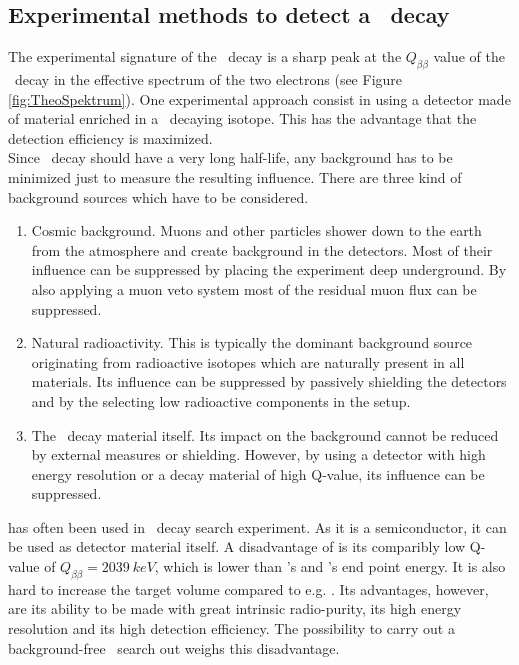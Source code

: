 \documentclass[encoding=utf8,british]{tumphthesis}
\begin{document}
\subsection{Experimental methods to detect a \onbb\ decay}

The experimental signature of the \onbb\ decay is a sharp peak at the $Q_{\beta\beta}$ value of the \twonu\ decay in the effective spectrum of the two electrons (see Figure \ref{fig:TheoSpektrum}).
One experimental approach consist in using a detector made of material enriched in a \onbb\ decaying isotope.
This has the advantage that the detection efficiency is maximized.
\\

Since \onbb\ decay should have a very long half-life, any background has to be minimized just to measure the resulting influence.
There are three kind of background sources which have to be considered.
\begin{enumerate}
    \item Cosmic background.
Muons and other particles shower down to the earth from the atmosphere and create background in the detectors.
Most of their influence can be suppressed by placing the experiment deep underground.
By also applying a muon veto system most of the residual muon flux can be suppressed.
\item Natural radioactivity.
This is typically the dominant background source originating from radioactive isotopes which are naturally present in all materials.
Its influence can be suppressed by passively shielding the detectors and by the selecting low radioactive components in the setup. 
\item The \twonu\ decay material itself.
Its impact on the background cannot be reduced by external measures or shielding.
However, by using a detector with high energy resolution or a decay material of high Q-value, its influence can be suppressed.
\end{enumerate}
 has often been used in \onbb\ decay search experiment. 
As it is a semiconductor, it can be used as detector material itself.
A disadvantage of  is its comparibly low Q-value of $Q_{\beta\beta} = 2039 \ \unit{keV}$, which is lower than 's and 's end point energy.
It is also hard to increase the target volume compared to e.g.  \cite{barabash_brief_2017}.
Its advantages, however, are its ability to be made with great intrinsic radio-purity, its high energy resolution and its high detection efficiency.
The possibility to carry out a background-free \onbb\ search \cite{agostini_background_2017} out weighs this disadvantage.
\\
\end{document}
